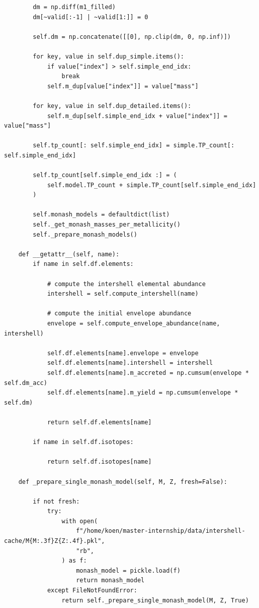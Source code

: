 \documentclass[a4paper,10pt]{article}
\begin{document}
\begin{verbatim}
        dm = np.diff(m1_filled)
        dm[~valid[:-1] | ~valid[1:]] = 0

        self.dm = np.concatenate([[0], np.clip(dm, 0, np.inf)])

        for key, value in self.dup_simple.items():
            if value["index"] > self.simple_end_idx:
                break
            self.m_dup[value["index"]] = value["mass"]

        for key, value in self.dup_detailed.items():
            self.m_dup[self.simple_end_idx + value["index"]] = value["mass"]

        self.tp_count[: self.simple_end_idx] = simple.TP_count[: self.simple_end_idx]

        self.tp_count[self.simple_end_idx :] = (
            self.model.TP_count + simple.TP_count[self.simple_end_idx]
        )

        self.monash_models = defaultdict(list)
        self._get_monash_masses_per_metallicity()
        self._prepare_monash_models()

    def __getattr__(self, name):
        if name in self.df.elements:

            # compute the intershell elemental abundance
            intershell = self.compute_intershell(name)

            # compute the initial envelope abundance
            envelope = self.compute_envelope_abundance(name, intershell)

            self.df.elements[name].envelope = envelope
            self.df.elements[name].intershell = intershell
            self.df.elements[name].m_accreted = np.cumsum(envelope * self.dm_acc)
            self.df.elements[name].m_yield = np.cumsum(envelope * self.dm)

            return self.df.elements[name]

        if name in self.df.isotopes:

            return self.df.isotopes[name]

    def _prepare_single_monash_model(self, M, Z, fresh=False):

        if not fresh:
            try:
                with open(
                    f"/home/koen/master-internship/data/intershell-cache/M{M:.3f}Z{Z:.4f}.pkl",
                    "rb",
                ) as f:
                    monash_model = pickle.load(f)
                    return monash_model
            except FileNotFoundError:
                return self._prepare_single_monash_model(M, Z, True)


\end{verbatim}
\end{document}
